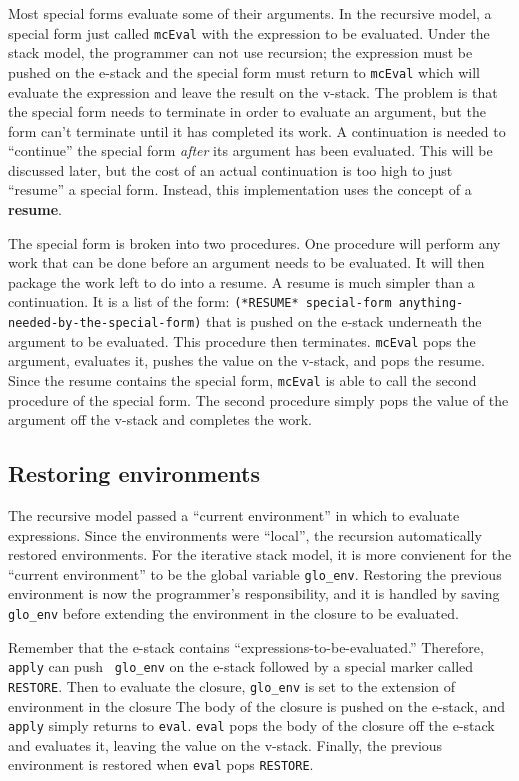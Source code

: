 	Most special forms evaluate some of their arguments.  In the
recursive model, a special form just called {\tt mcEval} with the
expression to be evaluated.  Under the stack model, the programmer can not
use recursion; the expression must be pushed on the e-stack and the
special form must return to {\tt mcEval} which will evaluate the
expression and leave the result on the v-stack.  The problem is that the
special form needs to terminate in order to evaluate an argument, but the
form can't terminate until it has completed its work.  A continuation is
needed to ``continue'' the special form {\em after} its argument has been
evaluated.  This will be discussed later, but the cost of an actual
continuation is too high to just ``resume'' a special form.  Instead,
this implementation uses the concept of a {\bf resume}.

	The special form is broken into two procedures.  One procedure
will perform any work that can be done before an argument needs to be
evaluated.  It will then package the work left to do into a resume.  A
resume is much simpler than a continuation.  It is a list of the form:
{\tt (*RESUME* special-form anything-needed-by-the-special-form)} that is
pushed on the e-stack underneath the argument to be evaluated.  This
procedure then terminates.  {\tt mcEval} pops the argument, evaluates it,
pushes the value on the v-stack, and pops the resume.  Since the resume
contains the special form, {\tt mcEval} is able to call the second
procedure of the special form.  The second procedure simply pops the value
of the argument off the v-stack and completes the work.

   \subsection{Restoring environments}

	The recursive model passed a ``current environment'' in which to
evaluate expressions.  Since the environments were ``local'', the
recursion automatically restored environments.  For the iterative stack
model, it is more convienent for the ``current environment'' to be the
global variable {\tt glo\_env}.  Restoring the previous environment is now
the programmer's responsibility, and it is handled by saving {\tt glo\_env}
before extending the environment in the closure to be evaluated.

	Remember that the e-stack contains
``expressions-to-be-evaluated.''  Therefore, {\tt apply} can push {\tt
glo_env} on the e-stack followed by a special marker called {\tt RESTORE}.
Then to evaluate the closure, {\tt glo\_env} is set to the extension of
environment in the closure  The body of the closure is pushed on the
e-stack, and {\tt apply} simply returns to {\tt eval}.  {\tt eval} pops
the body of the closure off the e-stack and evaluates it, leaving the
value on the v-stack.  Finally, the previous environment is restored when
{\tt eval} pops {\tt RESTORE}.


